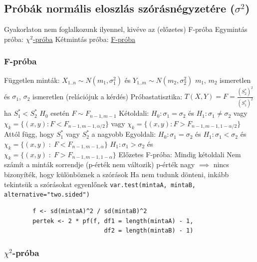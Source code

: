 \documentclass[12pt,a4paper]{article}
\begin{document}
\pagebreak

\subsection{Próbák normális eloszlás szórásnégyzetére ($\sigma^2$)}

\begin{outline}
	\1 Gyakorlaton nem foglalkozunk ilyennel, kivéve az (előzetes) F-próba
	\1 Egymintás próba: \hyperref[sec:próba-chi2]{$\chi^2$-próba}
	\1 Kétmintás próba: \hyperref[sec:próba-F]{F-próba}
\end{outline}

\subsubsection{F-próba}
\label{sec:próba-F}

\begin{outline}
	\1 Független minták: $X_{1..n} \sim N(m_1, \sigma_1^2)$ és $Y_{1..m} \sim N(m_2, \sigma_2^2)$
		\2 $m_1$, $m_2$ ismeretlen és $\sigma_1$, $\sigma_2$ ismeretlen (relációjuk a kérdés)
	\1 Próbastatisztika: $T(X,Y) = F = \frac{(S^*_2)^2}{(S^*_1)^2}$ \; ha $S^*_1 < S^*_2$
		\2 $H_0$ esetén $F \sim F_{n-1,m-1}$
	\1 Kétoldali: $H_0: \sigma_1 = \sigma_2$ és $H_1: \sigma_1 \ne \sigma_2$
		\2 vagy $\chi_k = \{ (x,y) : F < F_{n-1,m-1,\alpha/2} \}$
		\2 vagy $\chi_k = \{ (x,y) : F > F_{n-1,m-1,1-\alpha/2} \}$
		\2 Attól függ, hogy $S_1^*$ vagy $S_2^*$ a nagyobb
	\1 Egyoldali: $H_0: \sigma_1 = \sigma_2$ és 
		\2 $H_1: \sigma_1 < \sigma_2$ és $\chi_k = \{ (x,y) \;:\; F < F_{n-1,m-1,\alpha} \}$
		\2 $H_1: \sigma_1 > \sigma_2$ és $\chi_k = \{ (x,y) \;:\; F > F_{n-1,m-1,1-\alpha} \}$
	\1 Előzetes F-próba:
		\2 Mindig kétoldali
		\2 Nem számít a minták sorrendje (p-érték nem változik)
		\2 p-érték nagy $\implies$ nincs bizonyíték, hogy különböznek a szórások
			\3 Ha nem tudunk dönteni, inkább tekintsük a szórásokat egyenlőnek
		\2 \texttt{var.test(mintaA, mintaB, alternative="two.sided")}
		\2 \begin{verbatim}
		f <- sd(mintaA)^2 / sd(mintaB)^2
		pertek <- 2 * pf(f, df1 = length(mintaA) - 1,
		                    df2 = length(mintaB) - 1)
		\end{verbatim}
\end{outline}

\pagebreak

\subsubsection{$\chi^2$-próba}
\label{sec:próba-chi2}
\end{document}
